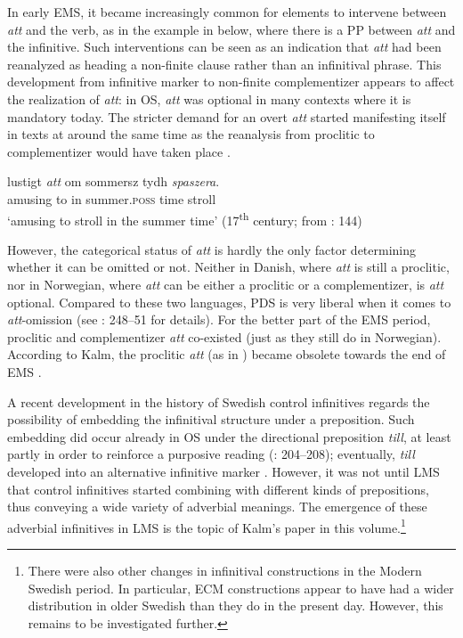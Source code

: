 \documentclass[output=paper]{langscibook}
\begin{document}
In early EMS, it became increasingly common for elements to intervene between \textit{att} and the verb, as in the example in  below, where there is a PP between \textit{att} and the infinitive. Such interventions can be seen as an indication that \textit{att} had been reanalyzed as heading a non-finite clause rather than an infinitival phrase. This development from infinitive marker to non-finite complementizer appears to affect the realization of \textit{att}: in OS, \textit{att} was optional in many contexts where it is mandatory today. The stricter demand for an overt \textit{att} started manifesting itself in texts at around the same time as the reanalysis from proclitic to complementizer would have taken place \citep[35]{Falk2010Studier}.


\ea \label{ex:intro:11}
\gll  lustigt \textit{att} om     sommersz     tydh \textit{spaszera}. \\
  amusing  to   in   summer.\textsc{poss}  time  stroll\\
\glt ‘amusing to stroll in the summer time’ (17\textsuperscript{th} century; from \citealt{Kalm2016Satsekvivalenta}: 144)
\z


However, the categorical status of \textit{att} is hardly the only factor determining whether it can be omitted or not. Neither in Danish, where \textit{att} is still a proclitic, nor in Norwegian, where \textit{att} can be either a proclitic or a complementizer, is \textit{att} optional. Compared to these two languages, PDS is very liberal when it comes to \textit{att}{}-omission (see \citealt{Faarlund2019}: 248–51 for details). For the better part of the EMS period, proclitic and complementizer \textit{att} co-existed (just as they still do in Norwegian). According to Kalm, the proclitic \textit{att} (as in ) became obsolete towards the end of EMS \citet[145]{Kalm2016Satsekvivalenta}.



A recent development in the history of Swedish control infinitives regards the possibility of embedding the infinitival structure under a preposition. Such embedding did occur already in OS under the directional preposition \textit{till}, at least partly in order to reinforce a purposive reading (\citealt{Kalm2016Satsekvivalenta}: 204–208); eventually, \textit{till} developed into an alternative infinitive marker \citep[210]{Kalm2016Satsekvivalenta}. However, it was not until LMS that control infinitives started combining with different kinds of prepositions, thus conveying a wide variety of adverbial meanings. The emergence of these adverbial infinitives in LMS is the topic of Kalm’s paper in this volume.\footnote{There were also other changes in infinitival constructions in the Modern Swedish period. In particular, ECM constructions appear to have had a wider distribution in older Swedish than they do in the present day. However, this remains to be investigated further.}
\end{document}

